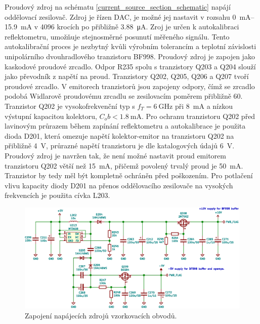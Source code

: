 Proudový zdroj na schématu \ref{current_source_section_schematic} napájí oddělovací zesilovač. Zdroj je řízen \acrshort{DAC}, je možné jej nastavit v rozsahu \SIrange{0}{15.9}{\si{mA}} v 4096 krocích po přibližně \SI{3.88}{\micro\ampere}. Zroj je určen k autokalibraci reflektometru, umožňuje stejnosměrné posunutí měřeného signálu. Tento autokalibrační proces je nezbytný kvůli výrobním tolerancím a teplotní závislosti unipolárního dvouhradlového tranzistoru BF998. Proudový zdroj je zapojen jako kaskodové proudové zrcadlo. Odpor R235 spolu s tranzistory Q203 a Q204 slouží jako převodník z napětí na proud. Tranzistory Q202, Q205, Q206 a Q207 tvoří proudové zrcadlo. V emitorech tranzistorů jsou zapojeny odpory, čímž se zrcadlo podobá Widlarově proudovému zrcadlu se zesilovacím poměrem přibližně 60. Tranzistor Q202 je vysokofrekvenční typ s $f_T=\SI{6}{\giga\hertz}$ při \SI{8}{\milli\ampere} a nízkou výstupní kapacitou kolektoru, $C_ob<\SI{1.8}{\milli\ampere}$. Pro ochranu tranzistoru Q202 před lavinovým průrazem během zapínání reflektometru a autokalibrace je použita dioda D201, která omezuje napětí kolektor-emitor na tranzistoru Q202 na přibližně \SI{4}{\volt}, průrazné napětí tranzistoru je dle katalogových údajů \SI{6}{\volt}. Proudový zdroj je navržen tak, že není možné nastavit proud emitorem tranzistoru Q202 větší než \SI{15}{\milli\ampere}, přičemž povolený trvalý proud je \SI{50}{\milli\ampere}. Tranzistor by tedy měl být kompletně ochráněn před poškozením. Pro potlačení vlivu kapacity diody D201 na přenos oddělovacího zesilovače na vysokých frekvencích je použita cívka L203.

\begin{figure}[htbp]
\includegraphics[width=\textwidth,keepaspectratio]{images/power_supply_section.eps}\caption{Zapojení napájecích zdrojů vzorkovacích obvodů.}\label{analog_source_section_schematic}
\end{figure}

